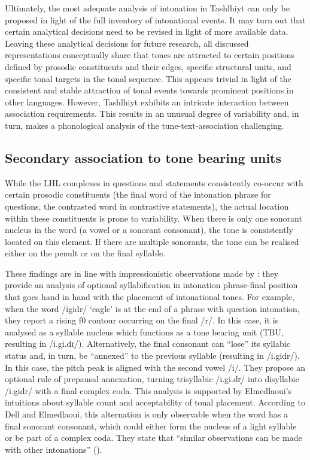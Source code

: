 Ultimately, the most adequate analysis of intonation in Tashlhiyt can only be proposed in light of the full inventory of intonational events. It may turn out that certain analytical decisions need to be revised in light of more available data. Leaving these analytical decisions for future research, all discussed representations conceptually share that tones are attracted to certain positions defined by prosodic constituents and their edges, specific structural units, and specific tonal targets in the tonal sequence. This appears trivial in light of the consistent and stable attraction of tonal events towards prominent positions in other languages. However, Tashlhiyt exhibits an intricate interaction between association requirements. This results in an unusual degree of variability and, in turn, makes a phonological analysis of the tune-text-association challenging.
 
\subsection{Secondary association to tone bearing units} 
While the LHL complexes in questions and statements consistently co-occur with certain prosodic constituents (the final word of the intonation phrase for questions, the contrasted word in contrastive statements), the actual location within these constituents is prone to variability. When there is only one sonorant nucleus in the word (a vowel or a sonorant consonant), the tone is consistently located on this element. If there are multiple sonorants, the tone can be realised either on the penult or on the final syllable. 

These findings are in line with impressionistic observations made by \citet{DE1985}: they provide an analysis of optional syllabification in intonation phrase-final position that goes hand in hand with the placement of intonational tones. For example, when the word /igidr/ ‘eagle’ is at the end of a phrase with question intonation, they report a rising f0 contour occurring on the final /r/. In this case, it is analysed as a syllable nucleus which functions as a tone bearing unit (TBU, resulting in /i.gi.dr̩/). Alternatively, the final consonant can “lose” its syllabic status and, in turn, be “annexed” to the previous syllable (resulting in /i.gidr/). In this case, the pitch peak is aligned with the second vowel /i/. They propose an optional rule of prepausal annexation, turning trisyllabic /i.gi.dr̩/ into disyllabic /i.gidr/ with a final complex coda. This analysis is supported by Elmedlaoui’s intuitions about syllable count and acceptability of tonal placement. According to Dell and Elmedlaoui, this alternation is only observable when the word has a final sonorant consonant, which could either form the nucleus of a light syllable or be part of a complex coda. They state that “similar observations can be made with other intonations” (\citealt[119f.]{DE1985}).

